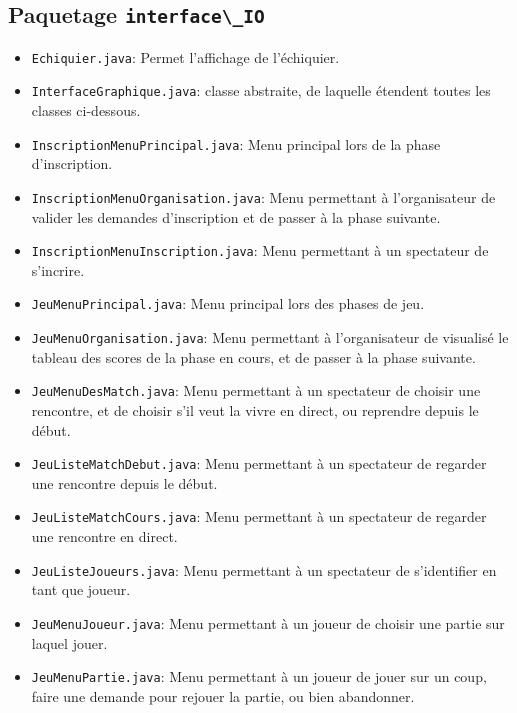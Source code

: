 \documentclass[10pt,a4paper]{report}
\begin{document}
\subsection{Paquetage \lstinline!interface\_IO!}
\begin{itemize}
\item \lstinline!Echiquier.java!: Permet l'affichage de l'échiquier.
\item \lstinline!InterfaceGraphique.java!: classe abstraite, de laquelle étendent toutes les classes ci-dessous.
\item \lstinline!InscriptionMenuPrincipal.java!: Menu principal lors de la phase d'inscription.
\item \lstinline!InscriptionMenuOrganisation.java!: Menu permettant à l'organisateur de valider les demandes d'inscription et de passer à la phase suivante.
\item \lstinline!InscriptionMenuInscription.java!: Menu permettant à un spectateur de s'incrire.
\item \lstinline!JeuMenuPrincipal.java!: Menu principal lors des phases de jeu.
\item \lstinline!JeuMenuOrganisation.java!: Menu permettant à l'organisateur de visualisé le tableau des scores de la phase en cours, et de passer à la phase suivante.
\item \lstinline!JeuMenuDesMatch.java!: Menu permettant à un spectateur de choisir une rencontre, et de choisir s'il veut la vivre en direct, ou reprendre depuis le début.
\item \lstinline!JeuListeMatchDebut.java!: Menu permettant à un spectateur de regarder une rencontre depuis le début.
\item \lstinline!JeuListeMatchCours.java!: Menu permettant à un spectateur de regarder une rencontre en direct.
\item \lstinline!JeuListeJoueurs.java!: Menu permettant à un spectateur de s'identifier en tant que joueur.
\item \lstinline!JeuMenuJoueur.java!: Menu permettant à un joueur de choisir une partie sur laquel jouer.
\item \lstinline!JeuMenuPartie.java!: Menu permettant à un joueur de jouer sur un coup, faire une demande pour rejouer la partie, ou bien abandonner.
\end{itemize}
\end{document}
